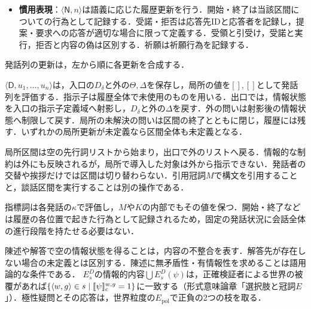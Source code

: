 \documentclass[../../main-detail.tex]{subfiles}
\begin{document}
\begin{definition}[発話の更新]
\begin{itemize}
\[        \]
        項指定は$\mathrm{dom}(a)\subseteq I$を要する．$\phi(a)$では，指定した各値が質問時の第1スコープを満たすという条件を残し，未指定の位置はその第1スコープ上で存在閉包する．極性応答は極性疑問にのみ用いる．
        束縛スコープを持たない式には$S_{w,g}=\{\emptyset\}$として$E^D_s(\psi):=E^D_s(S,\psi)$と略記する．まず$s_0=s\cap\bigcup E^D_s(\psi_r^\exists)$とする．極性応答では質問時に固定した提示命題の真理集合$T$を現文脈へ移し，肯定は$s_0=s\cap T$，否定は$s_0=s\setminus T$とし，極性応答では新しい指示子を導入せず$s'=s_0$とする．その他の解答では，$s_0$の各可能性について閉包前の$\psi_r$の証人を求め，新規指示子を$D_\delta$へ加えて登録し，$s'$を得る．更新前への射影$\pi[s']$が$Q$に属せば完全解答として選んだレコードだけを除き，そうでなければ部分解答として残す．残るすべての問いを$s'$へ移す．
        \item \textbf{慣用表現}：$\langle\mathsf N,n\rangle$は語義に応じた履歴更新を行う．開始・終了は当該区間についての行為として記録する．受諾・拒否は応答先IDと応答者を記録し，提案・要求への応答が適切な場合に限って定義する．受領と引受け，受諾と実行，拒否と内容の偽は区別する．祈願は祈願行為を記録する．
    \end{itemize}
    発話列の更新は，左から順に各更新を合成する．
\end{definition}

\begin{definition}[局所談話区間]
    $\langle\mathsf D,u_1,\ldots,u_n\rangle$は，入口の$D_\delta$と外の$\Theta,\Delta$を保存し，局所の値を$[],[]$として発話列を評価する．指示子は履歴全体で未使用のものを用いる．出口では，情報状態を入口の指示子定義域へ射影し，$D_\delta$と外の$\Delta$を戻す．外の問いは射影後の情報状態へ制限して戻す．局所の未解決の問いは区間の終了とともに閉じ，履歴には残す．いずれかの局所更新が未定義なら区間全体も未定義となる．
\end{definition}
\begin{remark}
    局所区間は空の先行詞リストから始まり，出口で外のリストへ戻る．情報的な制約は外にも反映されるが，局所で導入した対象は外から指示できない．発話者の交替や挨拶だけでは区間は切り替わらない．引用冠詞$M$で構文を引用することと，談話区間を実行することは別の操作である．
\end{remark}
\begin{remark}[指標詞と履歴]
    指標詞は各発話の$\kappa$で評価し，$M$や$K$の内部でもその値を保つ．開始・終了などは履歴の各位置で起きた行為として記録されるため，固定の発話状況に会話全体の進行段階を持たせる必要はない．
\end{remark}
\begin{remark}[適切性と選択肢]
    陳述や解答で空の情報状態を得ることは，内容の不整合を表す．解答先が存在しない場合の未定義とは区別する．陳述に無矛盾性・有情報性を求めることは語用論的な条件である．
    $E^D_s$の情報的内容$\bigcup E^D_s(\psi)$は，正確検証者による世界の被覆があれば$\{\langle w,g\rangle\in s\mid\llbracket\psi\rrbracket_c^{w,g}=1\}$に一致する（形式意味論章「選択肢と冠詞$E$」）．極性疑問とその応答は，世界粒度の$E_{\mathrm{pol}}$で正負の2つの枝を取る．
\end{remark}
\end{document}
